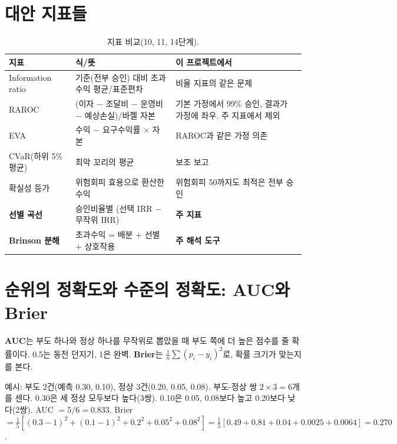 \section{대안 지표들}
\begin{table}[H]\centering\small
\begin{tabularx}{\linewidth}{@{}p{30mm}LL@{}}\toprule
지표 & 식/뜻 & 이 프로젝트에서\\\midrule
Information ratio & 기준(전부 승인) 대비 초과수익 평균/표준편차 & 비율 지표의 같은 문제\\
RAROC & (이자 $-$ 조달비 $-$ 운영비 $-$ 예상손실)/바젤 자본 & 기본 가정에서 99\% 승인, 결과가 가정에 좌우. 주 지표에서 제외\\
EVA & 수익 $-$ 요구수익률 \ensuremath{\times} 자본 & RAROC과 같은 가정 의존\\
CVaR(하위 5\% 평균) & 최악 꼬리의 평균 & 보조 보고\\
확실성 등가 & 위험회피 효용으로 환산한 수익 & 위험회피 50까지도 최적은 전부 승인\\
\textbf{선별 곡선} & 승인비율별 (선택 IRR $-$ 무작위 IRR) & \textbf{주 지표}\\
\textbf{Brinson 분해} & 초과수익 = 배분 + 선별 + 상호작용 & \textbf{주 해석 도구}\\\bottomrule
\end{tabularx}
\caption{지표 비교(10, 11, 14단계).}
\end{table}

\section{순위의 정확도와 수준의 정확도: AUC와 Brier}
\textbf{AUC}는 부도 하나와 정상 하나를 무작위로 뽑았을 때 부도 쪽에 더 높은 점수를 줄 확률이다. 0.5는 동전 던지기, 1은 완벽. \textbf{Brier}는 $\frac1n\sum(p_i-y_i)^2$로, 확률 크기가 맞는지를 본다.

\begin{workout}
 예시: 부도 2건(예측 0.30, 0.10), 정상 3건(0.20, 0.05, 0.08).
 부도-정상 쌍 $2\times3=6$개를 센다. 0.30은 세 정상 모두보다 높다(3쌍). 0.10은 0.05, 0.08보다 높고 0.20보다 낮다(2쌍). 
 AUC $=5/6=0.833$.
 Brier $=\frac15[(0.3-1)^2+(0.1-1)^2+0.2^2+0.05^2+0.08^2]=\frac15[0.49+0.81+0.04+0.0025+0.0064]=0.270$.
\end{workout}

